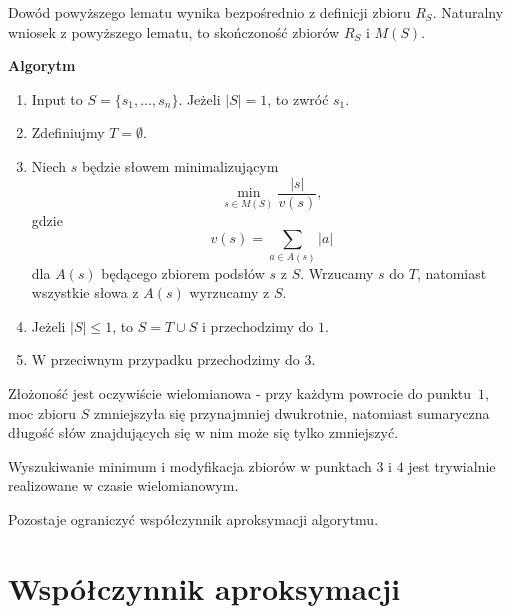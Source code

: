 \documentclass[12pt]{article}
\theoremstyle{plain}
\begin{document}
Dowód powyższego lematu wynika bezpośrednio z definicji zbioru $R_S$. Naturalny wniosek z powyższego lematu, to skończoność zbiorów $R_S$ i $M(S)$.
\bigskip


\textbf{Algorytm}
\begin{enumerate}
    \item Input to $S = \{s_1, \dots, s_n\}$. Jeżeli $|S| = 1$, to zwróć $s_1$.
    \item Zdefiniujmy $T = \emptyset$.
    \item Niech $s$ będzie słowem minimalizującym
    $$\min_{s \in M(S)} \frac{|s|}{v(s)},$$
    gdzie 
    $$v(s) = \sum_{a\in A(s)} |a|$$ 
    dla $A(s)$ będącego zbiorem podsłów $s$ z $S$. Wrzucamy $s$ do $T$, natomiast wszystkie słowa z $A(s)$ wyrzucamy z $S$.
    \item Jeżeli $|S| \leq 1$, to $S = T \cup S$ i przechodzimy do $1$.
    \item W przeciwnym przypadku przechodzimy do $3$.
\end{enumerate}

Złożoność jest oczywiście wielomianowa - przy każdym powrocie do punktu~$1$, moc zbioru $S$ zmniejszyła się przynajmniej dwukrotnie, natomiast sumaryczna długość słów znajdujących się w nim może się tylko zmniejszyć.

Wyszukiwanie minimum i modyfikacja zbiorów w punktach $3$ i $4$ jest trywialnie realizowane w czasie wielomianowym.

Pozostaje ograniczyć współczynnik aproksymacji algorytmu.

\section*{Współczynnik aproksymacji}
\end{document}
